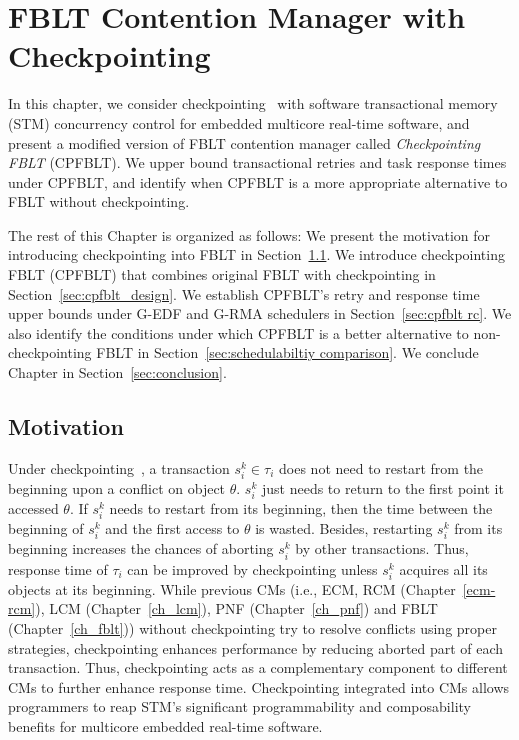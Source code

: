 \chapter{\label{ch_fblt_cp}FBLT Contention Manager with Checkpointing}

In this chapter, we consider checkpointing~\cite{Koskinen:2008:CCI:1378533.1378563} with software transactional memory (STM) concurrency control for embedded multicore real-time software, and present a modified version of FBLT contention manager called \textit{Checkpointing FBLT} (CPFBLT). We upper bound transactional retries and task response times under CPFBLT, and identify when CPFBLT is a more appropriate alternative to FBLT without checkpointing.

The rest of this Chapter is organized as follows: We present the motivation for introducing checkpointing into FBLT in Section~\ref{sec:motivation}. We introduce checkpointing FBLT (CPFBLT) that combines original FBLT with checkpointing in Section~\ref{sec:cpfblt_design}. We establish CPFBLT's retry and response time upper bounds under G-EDF and G-RMA schedulers in Section~\ref{sec:cpfblt rc}. We also identify the conditions under which CPFBLT is a better alternative to non-checkpointing FBLT in Section~\ref{sec:schedulabiltiy comparison}. We conclude Chapter in Section~\ref{sec:conclusion}.
%
\section{Motivation}\label{sec:motivation}
%
Under checkpointing~\cite{Koskinen:2008:CCI:1378533.1378563}, a transaction $s_i^k \in \tau_i$ does not need to restart from the beginning upon a conflict on object $\theta$. $s_i^k$ just needs to return to the first point it accessed $\theta$. If $s_i^k$ needs to restart from its beginning, then the time between the beginning of $s_i^k$ and the first access to $\theta$ is wasted. Besides, restarting $s_i^k$ from its beginning increases the chances of aborting $s_i^k$ by other transactions. Thus, response time of $\tau_i$ can be improved by checkpointing unless $s_i^k$ acquires all its objects at its beginning. While previous CMs (i.e., ECM, RCM (Chapter~\ref{ecm-rcm}), LCM (Chapter~\ref{ch_lcm}), PNF (Chapter~\ref{ch_pnf}) and FBLT (Chapter~\ref{ch_fblt})) without checkpointing try to resolve conflicts using proper strategies, checkpointing enhances performance by reducing aborted part of each transaction. Thus, checkpointing acts as a complementary component to different CMs to further enhance response time. Checkpointing integrated into CMs allows programmers to reap STM's significant programmability and composability benefits for multicore embedded real-time software.

